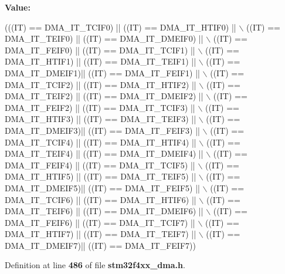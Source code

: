 {\bfseries Value\+:}
\begin{DoxyCode}
(((IT) == DMA_IT_TCIF0) || ((IT) == DMA_IT_HTIF0)  || \(\backslash\)
                           ((IT) == DMA_IT_TEIF0) || ((IT) == DMA_IT_DMEIF0) || \(\backslash\)
                           ((IT) == DMA_IT_FEIF0) || ((IT) == DMA_IT_TCIF1)  || \(\backslash\)
                           ((IT) == DMA_IT_HTIF1) || ((IT) == DMA_IT_TEIF1)  || \(\backslash\)
                           ((IT) == DMA_IT_DMEIF1)|| ((IT) == DMA_IT_FEIF1)  || \(\backslash\)
                           ((IT) == DMA_IT_TCIF2) || ((IT) == DMA_IT_HTIF2)  || \(\backslash\)
                           ((IT) == DMA_IT_TEIF2) || ((IT) == DMA_IT_DMEIF2) || \(\backslash\)
                           ((IT) == DMA_IT_FEIF2) || ((IT) == DMA_IT_TCIF3)  || \(\backslash\)
                           ((IT) == DMA_IT_HTIF3) || ((IT) == DMA_IT_TEIF3)  || \(\backslash\)
                           ((IT) == DMA_IT_DMEIF3)|| ((IT) == DMA_IT_FEIF3)  || \(\backslash\)
                           ((IT) == DMA_IT_TCIF4) || ((IT) == DMA_IT_HTIF4)  || \(\backslash\)
                           ((IT) == DMA_IT_TEIF4) || ((IT) == DMA_IT_DMEIF4) || \(\backslash\)
                           ((IT) == DMA_IT_FEIF4) || ((IT) == DMA_IT_TCIF5)  || \(\backslash\)
                           ((IT) == DMA_IT_HTIF5) || ((IT) == DMA_IT_TEIF5)  || \(\backslash\)
                           ((IT) == DMA_IT_DMEIF5)|| ((IT) == DMA_IT_FEIF5)  || \(\backslash\)
                           ((IT) == DMA_IT_TCIF6) || ((IT) == DMA_IT_HTIF6)  || \(\backslash\)
                           ((IT) == DMA_IT_TEIF6) || ((IT) == DMA_IT_DMEIF6) || \(\backslash\)
                           ((IT) == DMA_IT_FEIF6) || ((IT) == DMA_IT_TCIF7)  || \(\backslash\)
                           ((IT) == DMA_IT_HTIF7) || ((IT) == DMA_IT_TEIF7)  || \(\backslash\)
                           ((IT) == DMA_IT_DMEIF7)|| ((IT) == DMA_IT_FEIF7))
\end{DoxyCode}


Definition at line \textbf{ 486} of file \textbf{ stm32f4xx\+\_\+dma.\+h}.


